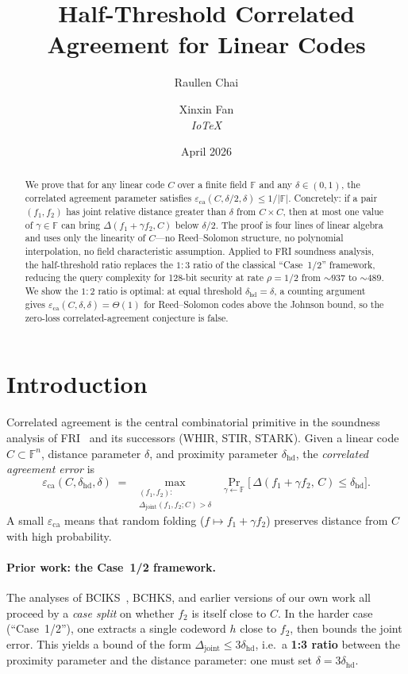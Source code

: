 \documentclass[11pt]{article}
\title{Half-Threshold Correlated Agreement for Linear Codes}
\author{Raullen Chai \and Xinxin Fan \\ \textit{IoTeX}}
\date{April 2026}
\newcommand{\FF}{\mathbb{F}}
\newcommand{\ca}{\varepsilon_{\mathrm{ca}}}
\newcommand{\dist}{\Delta}
\begin{document}
\maketitle

\begin{abstract}
We prove that for any linear code $C$ over a finite field $\FF$ and any
$\delta \in (0,1)$, the correlated agreement parameter satisfies
$\ca(C,\delta/2,\delta) \le 1/|\FF|$.  Concretely: if a pair
$(f_1,f_2)$ has joint relative distance greater than $\delta$ from
$C \times C$, then at most one value of $\gamma \in \FF$ can bring
$\dist(f_1 + \gamma f_2, C)$ below $\delta/2$.  The proof is four lines
of linear algebra and uses only the linearity of $C$---no
Reed--Solomon structure, no polynomial interpolation, no field
characteristic assumption.  Applied to FRI soundness analysis, the
half-threshold ratio replaces the $1{:}3$ ratio of the classical
``Case~1/2'' framework, reducing the query complexity for 128-bit
security at rate $\rho = 1/2$ from ${\sim}937$ to ${\sim}489$.  We show
the $1{:}2$ ratio is optimal: at equal threshold
$\delta_{\mathrm{hd}} = \delta$, a counting argument gives
$\ca(C,\delta,\delta) = \Theta(1)$ for Reed--Solomon codes above the
Johnson bound, so the zero-loss correlated-agreement conjecture is false.
\end{abstract}

\section{Introduction}

Correlated agreement is the central combinatorial primitive in the
soundness analysis of FRI~\cite{BBHR18} and its successors (WHIR, STIR,
STARK).  Given a linear code $C \subset \FF^n$, distance parameter
$\delta$, and proximity parameter $\delta_{\mathrm{hd}}$, the
\emph{correlated agreement error} is
\[
  \ca(C,\delta_{\mathrm{hd}},\delta)
  \;=\;
  \max_{\substack{(f_1,f_2):\\ \dist_{\mathrm{joint}}(f_1,f_2;C)>\delta}}
  \;\Pr_{\gamma \leftarrow \FF}\!\bigl[\,
    \dist(f_1 + \gamma f_2,\, C) \le \delta_{\mathrm{hd}}
  \bigr].
\]
A small $\ca$ means that random folding ($f \mapsto f_1 + \gamma f_2$)
preserves distance from $C$ with high probability.

\paragraph{Prior work: the Case~1/2 framework.}
The analyses of BCIKS~\cite{BCIKS20}, BCHKS, and earlier versions of our
own work all proceed by a \emph{case split} on whether $f_2$ is itself
close to $C$.  In the harder case (``Case~1/2''), one extracts a single
codeword $h$ close to $f_2$, then bounds the joint error.  This yields a
bound of the form $\dist_{\mathrm{joint}} \le 3\delta_{\mathrm{hd}}$,
i.e.\ a \textbf{1:3 ratio} between the proximity parameter and the
distance parameter: one must set $\delta = 3\delta_{\mathrm{hd}}$.
\end{document}
